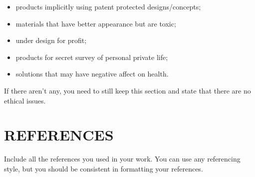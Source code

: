 \documentclass[12pt,a4paper]{article}
\begin{document}
\begin{itemize}[leftmargin=1.5em]
    \item products implicitly using patent protected designs/concepts;
    \item materials that have better appearance but are toxic;
    \item under design for profit;
    \item products for secret survey of personal private life;
    \item solutions that may have negative affect on health.
\end{itemize}

\noindent If there aren’t any, you need to still keep this section and state that there are no ethical issues.

\section{REFERENCES}
Include all the references you used in your work. You can use any referencing style, but you should be consistent in formatting your references.
\end{document}
